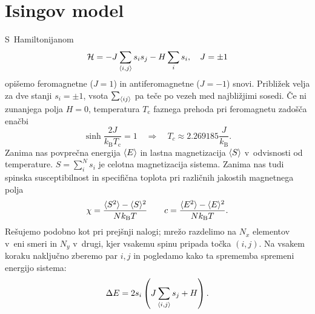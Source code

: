 \documentclass[a4paper,pdftex,10pt]{article}
\DeclarePairedDelimiter{\evdel}{\langle}{\rangle}   %
\numberwithin{figure}{section} %
\begin{document}
\section{Isingov model}
S~Hamiltonijanom
\begin{equation}
    \mathcal{H} = -J \sum_{\evdel{i,j}}s_i s_j - H \sum_i s_i, \quad J=\pm 1
\end{equation}
opišemo feromagnetne ($J=1$) in antiferomagnetne ($J=-1$) snovi. Približek velja za dve 
stanji $s_i = \pm 1$, vsota $\sum_{\evdel{ij}}$ pa teče po vezeh med najbližjimi sosedi. 
Če ni zunanjega polja $H=0$, temperatura $T_{\text{c}}$ faznega prehoda pri feromagnetu 
zadošča enačbi 
\begin{equation}
    \sinh \frac{2J}{k_{\text{B}} T_{\text{c}}} = 1 \quad \Longrightarrow \quad
    T_c \approx 2.269185 \frac{J}{k_{\text{B}}}.
\end{equation}
Zanima nas povprečna energija $\evdel{E}$ in lastna magnetizacija $\evdel{S}$ v~odvisnosti
od temperature. $S = \sum_i^N s_i$ je celotna magnetizacija sistema. Zanima nas tudi 
spinska susceptibilnost in specifična toplota pri različnih jakostih magnetnega polja
\begin{equation}
    \chi = \frac{ \evdel{S^2} - \evdel{S}^2}{N k_{\text{B}} T} \qquad
    c = \frac{ \evdel{E^2} - \evdel{E}^2}{N k_{\text{B}} T}.
\end{equation}
Rešujemo podobno kot pri prejšnji nalogi; mrežo razdelimo na $N_x$ elementov v~eni smeri
in $N_y$ v~drugi, kjer vsakemu spinu pripada točka $(i,j)$. Na vsakem koraku naključno
zberemo par $i,j$ in pogledamo kako ta sprememba spremeni energijo sistema:
\begin{equation}
    \Delta E = 2 s_i \left( J \sum_{\evdel{i,j}} s_j + H \right).
\end{equation}
\end{document}
